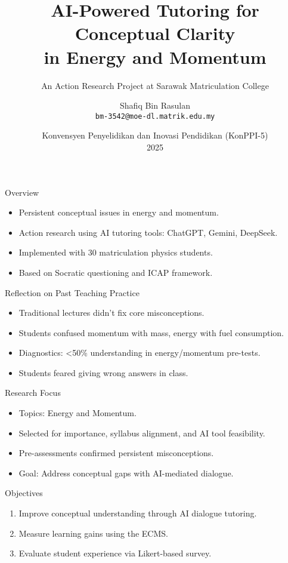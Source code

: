 \documentclass{beamer}
\title[AI Tutoring in Physics]{AI-Powered Tutoring for Conceptual Clarity\\ in Energy and Momentum}
\subtitle{An Action Research Project at Sarawak Matriculation College}
\author[Shafiq R]{Shafiq Bin Rasulan \\ \texttt{bm-3542@moe-dl.matrik.edu.my}}
\institute{KMSw}
\date{Konvensyen Penyelidikan dan Inovasi Pendidikan (KonPPI-5)\\ 2025}
\begin{document}
\begin{frame}
  \titlepage
\end{frame}

\begin{frame}{Overview}
\begin{itemize}
    \item Persistent conceptual issues in energy and momentum.
    \item Action research using AI tutoring tools: ChatGPT, Gemini, DeepSeek.
    \item Implemented with 30 matriculation physics students.
    \item Based on Socratic questioning and ICAP framework.
\end{itemize}
\end{frame}

\begin{frame}{Reflection on Past Teaching Practice}
\begin{itemize}
    \item Traditional lectures didn't fix core misconceptions.
    \item Students confused momentum with mass, energy with fuel consumption.
    \item Diagnostics: <50\% understanding in energy/momentum pre-tests.
    \item Students feared giving wrong answers in class.
\end{itemize}
\end{frame}

\begin{frame}{Research Focus}
\begin{itemize}
    \item Topics: Energy and Momentum.
    \item Selected for importance, syllabus alignment, and AI tool feasibility.
    \item Pre-assessments confirmed persistent misconceptions.
    \item Goal: Address conceptual gaps with AI-mediated dialogue.
\end{itemize}
\end{frame}

\begin{frame}{Objectives}
\begin{enumerate}
    \item Improve conceptual understanding through AI dialogue tutoring.
    \item Measure learning gains using the ECMS.
    \item Evaluate student experience via Likert-based survey.
\end{enumerate}
\end{frame}
\end{document}
